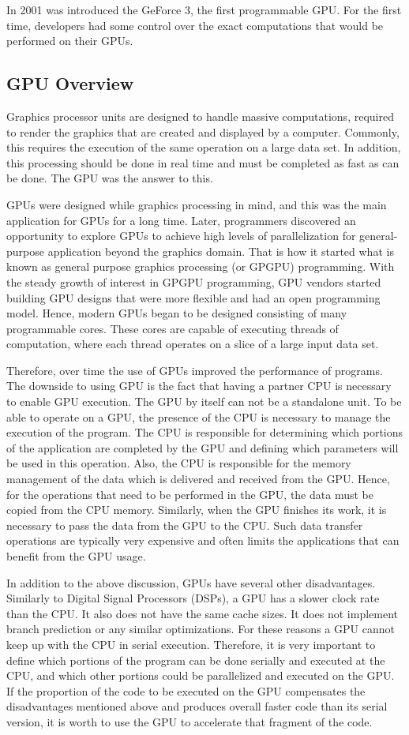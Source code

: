 \documentclass[Ingles]{ic-tese-v1}
\begin{document}
In 2001 was introduced the GeForce 3, the first programmable GPU.
For the first time, developers had some control over the exact computations
that would be performed on their GPUs.

\subsection{GPU Overview}
Graphics processor units are designed to handle massive computations,
required to render the graphics that are created and displayed by a computer.
Commonly, this requires the execution of the same operation on a large data set.
In addition, this processing should be done in real time and must be completed as
fast as can be done. The GPU was the answer to this.

GPUs were designed while graphics processing in mind, and this was the main application
for GPUs for a long time. Later, programmers discovered an opportunity
to explore GPUs to achieve high levels of parallelization for general-purpose
application beyond the graphics domain.  That is how it started
what is known as general purpose graphics processing (or GPGPU) programming.
With the steady growth of interest in GPGPU programming, GPU vendors
started building GPU designs that were more flexible and had an open
programming model. Hence, modern GPUs began to be designed consisting of many
programmable cores. These cores are capable of executing
threads of computation, where each thread operates on a slice of
a large  input data set.

Therefore, over time the use of GPUs improved the performance of programs.
The downside to using GPU is
the fact that having a partner CPU is necessary to enable GPU execution.
The GPU by itself can not be a standalone unit. To be able to operate on a GPU, the presence of the CPU is
necessary to manage the execution of the program. The CPU is responsible for
determining which portions of the application are completed by the GPU and defining which
parameters will be used in this operation. Also,
the CPU is responsible for the memory management of the data which is
delivered and received from the GPU. Hence, for  the
operations that need to be performed in the GPU, the data must be copied from the CPU
memory. Similarly, when the GPU finishes its work, it is necessary to pass
the data from the GPU to the CPU. Such data transfer operations are typically  very expensive
and often limits the applications that can benefit from the GPU usage.

In addition to the above discussion, GPUs have several other
disadvantages.  Similarly to Digital Signal Processors (DSPs), a GPU has a
slower clock rate than the CPU. It also does not have the same cache sizes.
It does not implement branch prediction or any similar optimizations. For these
reasons a GPU cannot keep up with the CPU in serial
execution. Therefore, it is very important to define which portions of
the program can be done serially and executed at the CPU, and which other
portions could be parallelized and executed on the GPU. If the proportion of
the code to be executed on the GPU compensates the disadvantages mentioned
above and produces overall faster code than its serial version, it is worth to use the
GPU to accelerate  that fragment of the code.
\end{document}
